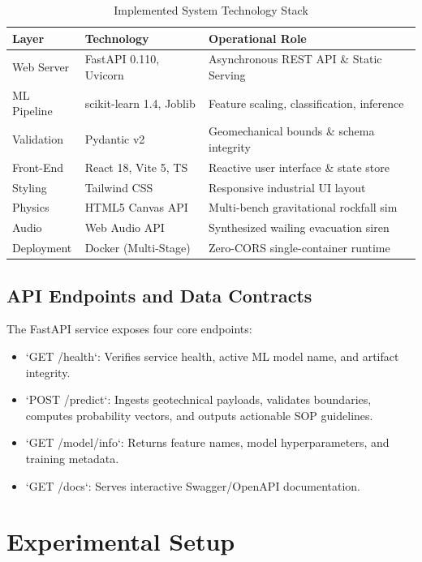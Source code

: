 \documentclass[conference]{IEEEtran}
\begin{document}
\begin{table}[htbp]
\caption{Implemented System Technology Stack}
\begin{center}
\begin{tabular}{lll}
\toprule
\textbf{Layer} & \textbf{Technology} & \textbf{Operational Role} \\
\midrule
Web Server & FastAPI 0.110, Uvicorn & Asynchronous REST API \& Static Serving \\
ML Pipeline & scikit-learn 1.4, Joblib & Feature scaling, classification, inference \\
Validation & Pydantic v2 & Geomechanical bounds \& schema integrity \\
Front-End & React 18, Vite 5, TS & Reactive user interface \& state store \\
Styling & Tailwind CSS & Responsive industrial UI layout \\
Physics & HTML5 Canvas API & Multi-bench gravitational rockfall sim \\
Audio & Web Audio API & Synthesized wailing evacuation siren \\
Deployment & Docker (Multi-Stage) & Zero-CORS single-container runtime \\
\bottomrule
\end{tabular}
\label{tab:stack}
\end{center}
\end{table}

\subsection{API Endpoints and Data Contracts}
The FastAPI service exposes four core endpoints:
\begin{itemize}
    \item `GET /health`: Verifies service health, active ML model name, and artifact integrity.
    \item `POST /predict`: Ingests geotechnical payloads, validates boundaries, computes probability vectors, and outputs actionable SOP guidelines.
    \item `GET /model/info`: Returns feature names, model hyperparameters, and training metadata.
    \item `GET /docs`: Serves interactive Swagger/OpenAPI documentation.
\end{itemize}

\section{Experimental Setup}
\end{document}
